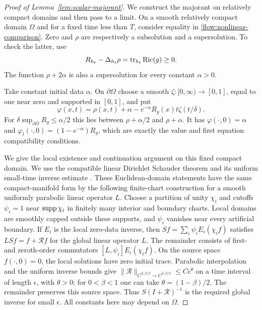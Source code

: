 \begin{proof}[Proof of Lemma~\ref{lem:scalar-majorant}]
We construct the majorant on relatively compact domains and then
pass to a limit.
On a smooth relatively compact domain
$\Omega$ and for a fixed time less than $T$, consider equality in
\eqref{flow:nonlinear-comparison}.  Zero and $\rho$ are respectively
a subsolution and a supersolution.  To check the latter, use
\[
 R_{h_t}-\Delta_{h_t}\rho=\operatorname{tr}_{h_t}\operatorname{Ric}(g)\ge0.
\]
The function $\rho+2\alpha$ is also a supersolution for every
constant $\alpha>0$.

Take constant initial data $\alpha$.  On $\partial\Omega$ choose
a smooth $\zeta:[0,\infty)\to[0,1]$, equal to one near zero and
supported in $[0,1]$, and put
\[
 \varphi(x,t)=\rho(x,t)+\alpha
       -e^{-\alpha}R_g(x)t\zeta(t/\delta).
\]
For $\delta\sup_{\partial\Omega}R_g\le\alpha/2$ this lies between
$\rho+\alpha/2$ and $\rho+\alpha$.
It has $\varphi(\cdot,0)=\alpha$ and
$\varphi_t(\cdot,0)=(1-e^{-\alpha})R_g$, which are exactly the
value and first equation compatibility conditions.

We give the local existence and continuation argument on this
fixed compact domain.  We use the compatible linear Dirichlet
Schauder theorem \cite[Chapter~IV, Theorem~5.2]{LSU} and its
uniform small-time inverse estimate
\cite[Chapter~IV, Theorem~5.4]{LSU}.
These Euclidean-domain statements have the same compact-manifold
form by the following finite-chart construction for a smooth
uniformly parabolic linear operator $L$.  Choose a partition of
unity $\chi_i$ and cutoffs $\psi_i=1$ near $\operatorname{supp}\chi_i$ in
finitely many interior and boundary charts.  Local domains are
smoothly capped outside these supports, and $\psi_i$ vanishes near
every artificial boundary.  If $E_i$ is the local zero-data inverse,
then $Sf=\sum_i\psi_i E_i(\chi_i f)$ satisfies
$LSf=f+\mathcal Rf$ for the global linear operator $L$.
The remainder consists of first- and zeroth-order commutators
$[L,\psi_i]E_i(\chi_i f)$.  On the source space
$f(\cdot,0)=0$, the local solutions have zero initial trace.
Parabolic interpolation and the uniform inverse bounds give
$\|\mathcal R\|_{C^{\beta,\beta/2}\to C^{\beta,\beta/2}}
\le C\epsilon^\theta$ on a time interval of length $\epsilon$,
with $\theta>0$; for $0<\beta<1$ one can take
$\theta=(1-\beta)/2$.  The remainder preserves this source space.
Thus $S(I+\mathcal R)^{-1}$ is the required global inverse for
small $\epsilon$.  All constants here may depend on $\Omega$.


\end{proof}
